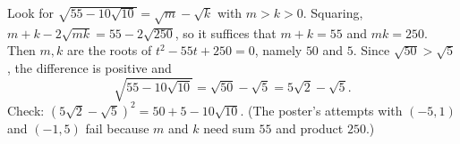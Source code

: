 Look for $\sqrt{55-10\sqrt{10}}=\sqrt m-\sqrt k$ with $m>k>0$. Squaring, $m+k-2\sqrt{mk}=55-2\sqrt{250}$, so it suffices that $m+k=55$ and $mk=250$. Then $m,k$ are the roots of $t^2-55t+250=0$, namely $50$ and $5$. Since $\sqrt{50}>\sqrt5$, the difference is positive and
\[
\sqrt{55-10\sqrt{10}}=\sqrt{50}-\sqrt5=\boxed{5\sqrt2-\sqrt5}.
\]
Check: $(5\sqrt2-\sqrt5)^2=50+5-10\sqrt{10}$. (The poster's attempts with $(-5,1)$ and $(-1,5)$ fail because $m$ and $k$ need sum $55$ and product $250$.)
